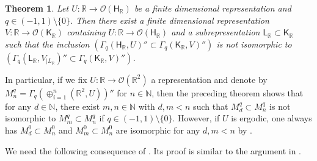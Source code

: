 \documentclass[a4paper,11pt]{amsart}
\newtheorem{thm}{Theorem}[section]
\theoremstyle{definition}
\newcommand{\N}{{\mathbb N}}
\newcommand{\R}{{\mathbb R}}
\newcommand{\cO}{{\mathcal O}}
\newcommand{\sH}{\mathsf{H}}
\newcommand{\sK}{\mathsf{K}}
\newcommand{\sL}{\mathsf{L}}
\begin{document}
\begin{thm}\label{thm: non-iso inclusions}
Let $U:\R\to \cO(\sH_\R)$ be a finite dimensional representation and $q\in (-1,1)\setminus \{0\}$.
Then there exist a finite dimensional representation $V: \R\to \cO(\sK_\R)$ containing $U: \R\to \cO(\sH_\R)$
	and a subrepresentation $\sL_\R\subset \sK_\R$ such that the inclusion
	$(\Gamma_q(\sH_\R, U)''\subset \Gamma_q(\sK_\R, V)'')$ is not isomorphic to 
	$(\Gamma_q(\sL_\R, V_{\mid L_\R})''\subset \Gamma_q(\sK_\R, V)'')$.
\end{thm}

In particular, if we fix $U:\R\to \cO(\R^2)$ a representation
	and denote by $M_n^q=\Gamma_q(\oplus_{i=1}^n (\R^2, U))''$ for  $n\in \N$,
	then the preceding theorem shows that for any $d\in \N$, there exist $m,n\in \N$
	with $d,m<n$ such that $M_d^q\subset M_n^q$ is not isomorphic to $M_m^q\subset M_n^q$
	if $q\in (-1,1)\setminus\{0\}$.
However, if $U$ is ergodic, one always has $M_d^0\subset M_n^0$ and $M_m^0\subset M_n^0$ are isomorphic for any $d,m<n$ by \cite{Sh97}.

We need the following consequence of \cite{Con74}.
Its proof is similar to the argument in \cite[Theorem F]{HSV19}.
\end{document}
